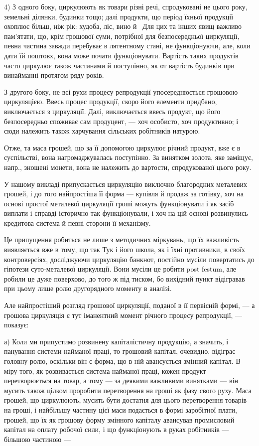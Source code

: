 
4) З одного боку, циркулюють як товари різні речі, спродуковані
не цього року, земельні ділянки, будинки тощо; далі продукти, що
період їхньої продукції охоплює більш, ніж рік: худоба, ліс, вино й~
Для цих та інших явищ важливо пам’ятати, що, крім грошової суми,
потрібної для безпосередньої циркуляції, певна частина завжди перебуває
в лятентному стані, не функціонуючи, але, коли дати їй поштовх, вона
може почати функціонувати. Вартість таких продуктів часто циркулює
також частинами й поступінно, як от вартість будинків при винайманні
протягом ряду років.

З другого боку, не всі рухи процесу репродукції упосереднюється
грошовою циркуляцією. Ввесь процес продукції, скоро його елементи
придбано, виключається з циркуляції. Далі, виключається ввесь продукт,
що його безпосередньо споживає сам продуцент, — хоч особисто, хоч
продуктивно; і сюди належить також харчування сільських робітників
натурою.

Отже, та маса грошей, що за її допомогою циркулює річний продукт,
вже є в суспільстві, вона нагромаджувалась поступінно. За винятком золота,
яке заміщує, напр., зношені монети, вона не належить до вартости,
спродукованої цього року.

У нашому викладі припускається циркуляцію виключно благородних
металевих грошей, і до того найпростіша її форма — купівля й продаж
за готівку, хоч на основі простої металевої циркуляції гроші можуть
функціонувати і як засіб виплати і справді історично так функціонували,
і хоч на цій основі розвинулись кредитова система й певні сторони
її механізму.

Це припущення робиться не лише з методичних міркувань, що їх важливість
виявляється вже в тому, що так Тук і його школа, як і їхні противники,
в своїх контроверсіях, досліджуючи циркуляцію банкнот, постійно
мусіли повертатись до гіпотези суто-металевої циркуляції. Вони мусіли
це робити post festum, але робили це дуже поверхово, до того ж під
тиском, бо вихідний пункт відігравав при цьому лише ролю другорядного
моменту в аналізі.

Але найпростіший розгляд грошової циркуляції, поданої в її первісній
формі, — а грошова циркуляція є тут іманентний момент річного процесу
репродукції, — показує:

а) Коли ми припустимо розвинену капіталістичну продукцію, а значить,
і панування системи найманої праці, то грошовий капітал, очевидно,
відіграє головну ролю, оскільки він є форма, що в ній авансується
змінний капітал. В міру того, як розвивається система найманої праці,
кожен продукт перетворюється на товар, а тому — за деякими важливими
винятками — він мусить також цілком проробити перетворення на
гроші як фазу свого руху. Маса грошей, що циркулюють, мусить бути
достатня для цього перетворення товарів на гроші, і найбільшу частину
цієї маси подається в формі заробітної плати, грошей, що їх як грошову
форму змінного капіталу авансував промисловий капітал на оплату робочої
сили, і що функціонують в руках робітників — більшою частиною —
\parbreak{}  %
